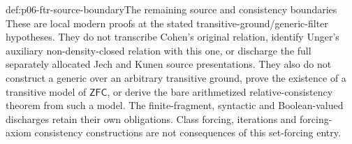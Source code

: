 \begin{proofboundary}{def:p06-ftr-source-boundary}{The remaining source and consistency boundaries}
These are local modern proofs at the stated transitive-ground/generic-filter
hypotheses. They do not transcribe Cohen's original relation, identify
Unger's auxiliary non-density-closed relation with this one, or discharge
the full separately allocated Jech and Kunen source presentations.
They also do not construct a generic over an arbitrary transitive ground,
prove the existence of a transitive model of \(\mathsf{ZFC}\), or derive
the bare arithmetized relative-consistency theorem from such a model.
The finite-fragment, syntactic and Boolean-valued discharges retain their
own obligations. Class forcing, iterations and forcing-axiom consistency
constructions are not consequences of this set-forcing entry.
\end{proofboundary}

